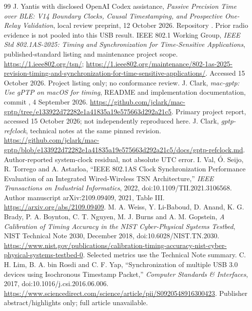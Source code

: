 \documentclass[11pt,letterpaper]{article}
\begin{document}
\begin{thebibliography}{99}\small
{} J. Yantis with disclosed OpenAI Codex assistance, \emph{Passive Precision Time over BLE: V14 Boundary Clocks, Causal Timestamping, and Prospective One-Relay Validation}, local review preprint, 12 October 2026. Repository . Prior radio evidence is not pooled into this USB result.
 IEEE 802.1 Working Group, \emph{IEEE Std 802.1AS-2025: Timing and Synchronization for Time-Sensitive Applications}, published-standard listing and maintenance project scope. \url{https://1.ieee802.org/tsn/}; \url{https://1.ieee802.org/maintenance/802-1as-2025-revision-timing-and-synchronization-for-time-sensitive-applications/}. Accessed 15 October 2026. Project listing only; no conformance review.
 J. Clark, \emph{mac-gptp: Use gPTP on macOS for timing}, README and implementation documentation, commit , 4 September 2026. \url{https://github.com/jclark/mac-gptp/tree/e133922d72282e1a41835a19e575663d292a21c5}. Primary project report, accessed 15 October 2026; not independently reproduced here.
 J. Clark, \emph{gptp-refclock}, technical notes at the same pinned revision. \url{https://github.com/jclark/mac-gptp/blob/e133922d72282e1a41835a19e575663d292a21c5/docs/gptp-refclock.md}. Author-reported system-clock residual, not absolute UTC error.
 I. Val, \'O. Seijo, R. Torrego and A. Astarloa, ``IEEE 802.1AS Clock Synchronization Performance Evaluation of an Integrated Wired-Wireless TSN Architecture,'' \emph{IEEE Transactions on Industrial Informatics}, 2022, doi:10.1109/TII.2021.3106568. Author manuscript arXiv:2109.09409, 2021, Table III. \url{https://arxiv.org/abs/2109.09409}.
 M. A. Weiss, Y. Li-Baboud, D. Anand, K. G. Brady, P. A. Boynton, C. T. Nguyen, M. J. Burns and A. M. Gopstein, \emph{A Calibration of Timing Accuracy in the NIST Cyber-Physical Systems Testbed}, NIST Technical Note 2030, December 2018, doi:10.6028/NIST.TN.2030. \url{https://www.nist.gov/publications/calibration-timing-accuracy-nist-cyber-physical-systems-testbed-0}. Selected metrics use the Technical Note summary.
 C. H. Lim, B. A. bin Rosdi and C. F. Yap, ``Synchronization of multiple USB 3.0 devices using Isochronous Timestamp Packet,'' \emph{Computer Standards \& Interfaces}, 2017, doi:10.1016/j.csi.2016.06.006. \url{https://www.sciencedirect.com/science/article/pii/S0920548916300423}. Publisher abstract/highlights only; full article unavailable.

\end{thebibliography}
\end{document}

